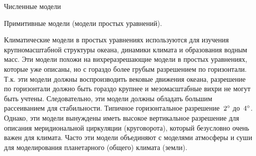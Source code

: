 \begin{chapter}{Численные модели}
\begin{section}{Примитивные модели (модели простых уравнений).}
\begin{paragraph}{Климатические модели в простых уравнениях}
используются для изучения крупномасштабной структуры океана, динамики
климата и образования водным масс. Эти модели похожи на
вихреразрешающие модели в простых уравнениях, которые уже описаны, но
с гораздо более грубым разрешением по горизонтали. Т.к. эти модели
должны воспроизводить вековые движения океана, разрешение по
горизонтали должно быть гораздо крупнее и мезомасштабные вихри не
могут быть учтены. Следовательно, эти модели должны обладать большим
рассеиванием для стабильности. Типичное горизонтальное разрешение~${2}^\circ$
до~${4}^\circ$. Однако, эти модели вынуждены иметь высокое вертикальное
разрешение для описания меридиональной циркуляции (круговорота),
который безусловно очень важен для климата. Часто эти модели
объединяют с моделями атмосферы и суши для моделирования планетарного
(общего) климата (земли).
% 
\end{paragraph}
\end{section}


\end{chapter}
